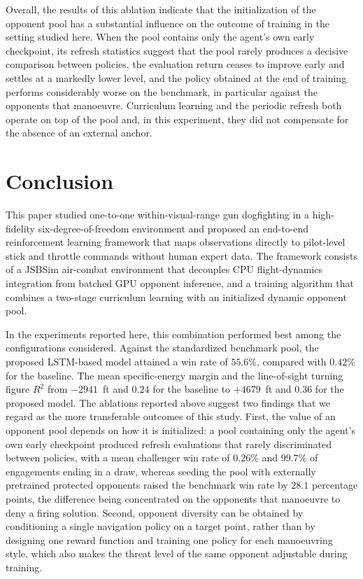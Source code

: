 \documentclass[pdflatex,sn-mathphys-num]{sn-jnl}%
\theoremstyle{thmstyleone}%
\theoremstyle{thmstyletwo}%
\theoremstyle{thmstylethree}%
\begin{document}
Overall, the results of this ablation indicate that the initialization of the opponent pool has a substantial influence on the outcome of training in the setting studied here. When the pool contains only the agent's own early checkpoint, its refresh statistics suggest that the pool rarely produces a decisive comparison between policies, the evaluation return ceases to improve early and settles at a markedly lower level, and the policy obtained at the end of training performs considerably worse on the benchmark, in particular against the opponents that manoeuvre. Curriculum learning and the periodic refresh both operate on top of the pool and, in this experiment, they did not compensate for the absence of an external anchor.


\section{Conclusion}
\label{sec:conclusion}

This paper studied one-to-one within-visual-range gun dogfighting in a high-fidelity six-degree-of-freedom environment and proposed an end-to-end reinforcement learning framework that maps observations directly to pilot-level stick and throttle commands without human expert data. The framework consists of a JSBSim air-combat environment that decouples CPU flight-dynamics integration from batched GPU opponent inference, and a training algorithm that combines a two-stage curriculum learning with an initialized dynamic opponent pool.

In the experiments reported here, this combination performed best among the configurations considered. Against the standardized benchmark pool, the proposed LSTM-based model attained a win rate of $55.6\%$, compared with $0.42\%$ for the baseline. The mean specific-energy margin and the line-of-sight turning figure $R^{2}$ from $-2941$~ft and $0.24$ for the baseline to $+4679$~ft and $0.36$ for the proposed model. The ablations reported above suggest two findings that we regard as the more transferable outcomes of this study. First, the value of an opponent pool depends on how it is initialized: a pool containing only the agent's own early checkpoint produced refresh evaluations that rarely discriminated between policies, with a mean challenger win rate of $0.26\%$ and $99.7\%$ of engagements ending in a draw, whereas seeding the pool with externally pretrained protected opponents raised the benchmark win rate by $28.1$ percentage points, the difference being concentrated on the opponents that manoeuvre to deny a firing solution. Second, opponent diversity can be obtained by conditioning a single navigation policy on a target point, rather than by designing one reward function and training one policy for each manoeuvring style, which also makes the threat level of the same opponent adjustable during training.
\end{document}
